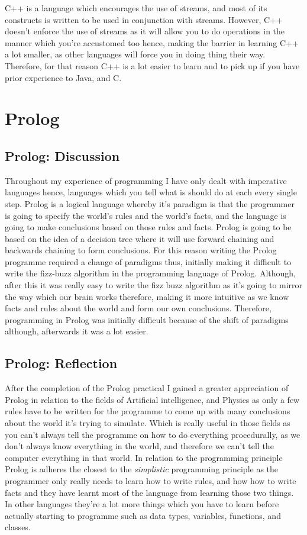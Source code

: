 \documentclass[
	12pt, %
]{fphw}
\begin{document}
C++ is a language which encourages the use of streams, and most of its constructs
is written to be used in conjunction with streams. However, C++ doesn't enforce
the use of streams as it will allow you to do operations in the manner which you're
accustomed too hence, making the barrier in learning C++ a lot smaller, as other
languages will force you in doing thing their way. Therefore, for that reason
C++ is a lot easier to learn and to pick up if you have prior experience to Java,
and C.

\section{Prolog}

\subsection{Prolog: Discussion}
Throughout my experience of programming I have only dealt with imperative languages
hence, languages which you tell what is should do at each every single step.
Prolog is a logical language whereby it's paradigm is that the programmer is
going to specify the world's rules and the world's facts, and the language is
going to make conclusions based on those rules and facts. Prolog is going to be
based on the idea of a decision tree where it will use forward chaining and
backwards chaining to form conclusions. For this reason writing the Prolog programme
required a change of paradigms thus, initially making it difficult to write the
fizz-buzz algorithm in the programming language of Prolog. Although, after this
it was really easy to write the fizz buzz algorithm as it's going to mirror the
way which our brain works therefore, making it more intuitive as we know facts
and rules about the world and form our own conclusions. Therefore, programming
in Prolog was initially difficult because of the shift of paradigms although, afterwards
it was a lot easier.

\subsection{Prolog: Reflection}
After the completion of the Prolog practical I gained a greater appreciation of Prolog
in relation to the fields of Artificial intelligence, and Physics as only a few rules
have to be written for the programme to come up with many conclusions about the world
it's trying to simulate. Which is really useful in those fields as you can't always
tell the programme on how to do everything procedurally, as we don't always know
everything in the world, and therefore we can't tell the computer everything in that
world. In relation to the programming principle Prolog is adheres the closest to the \emph{simplistic} programming principle as the programmer only really needs to learn
how to write rules, and how how to write facts and they have learnt most of the language
from learning those two things. In other languages they're a lot more things which you
have to learn before actually starting to programme such as data types, variables,
functions, and classes.
\end{document}
